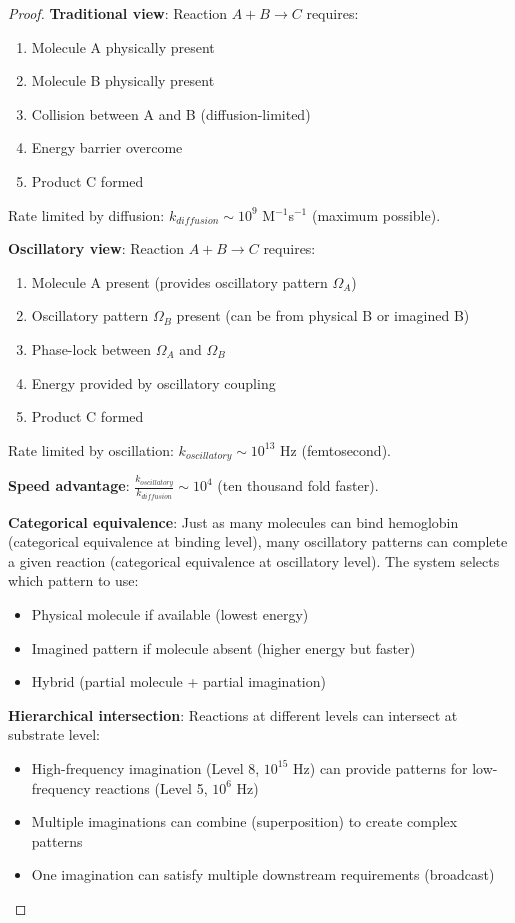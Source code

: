 \documentclass[11pt,a4paper]{article}
\begin{document}
\begin{proof}
\textbf{Traditional view}: Reaction $A + B \to C$ requires:
\begin{enumerate}
\item Molecule A physically present
\item Molecule B physically present  
\item Collision between A and B (diffusion-limited)
\item Energy barrier overcome
\item Product C formed
\end{enumerate}

Rate limited by diffusion: $k_{diffusion} \sim 10^9$ M$^{-1}$s$^{-1}$ (maximum possible).

\textbf{Oscillatory view}: Reaction $A + B \to C$ requires:
\begin{enumerate}
\item Molecule A present (provides oscillatory pattern $\Omega_A$)
\item Oscillatory pattern $\Omega_B$ present (can be from physical B or imagined B)
\item Phase-lock between $\Omega_A$ and $\Omega_B$
\item Energy provided by oscillatory coupling
\item Product C formed
\end{enumerate}

Rate limited by oscillation: $k_{oscillatory} \sim 10^{13}$ Hz (femtosecond).

\textbf{Speed advantage}: $\frac{k_{oscillatory}}{k_{diffusion}} \sim 10^4$ (ten thousand fold faster).

\textbf{Categorical equivalence}: Just as many molecules can bind hemoglobin (categorical equivalence at binding level), many oscillatory patterns can complete a given reaction (categorical equivalence at oscillatory level). The system selects which pattern to use:
\begin{itemize}
\item Physical molecule if available (lowest energy)
\item Imagined pattern if molecule absent (higher energy but faster)
\item Hybrid (partial molecule + partial imagination)
\end{itemize}

\textbf{Hierarchical intersection}: Reactions at different levels can intersect at substrate level:
\begin{itemize}
\item High-frequency imagination (Level 8, $10^{15}$ Hz) can provide patterns for low-frequency reactions (Level 5, $10^6$ Hz)
\item Multiple imaginations can combine (superposition) to create complex patterns
\item One imagination can satisfy multiple downstream requirements (broadcast)
\end{itemize}


\end{proof}
\end{document}
